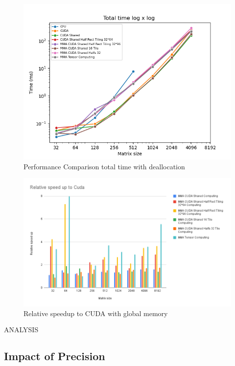 \documentclass[conference]{IEEEtran}
\begin{document}
  \begin{figure}[htbp]
    \centering
    \includegraphics[scale=0.5]{figures/Tot_time_deac.png}
    \caption{Performance Comparison total time with deallocation}
    \label{fig:time-comparison}
  \end{figure}



  \begin{figure}[htbp]
    \centering
    \includegraphics[scale=0.38]{figures/Relative speed up to Cuda.png}
    \caption{Relative speedup to CUDA with global memory}
    \label{fig:performance-comparison}
  \end{figure}
  
  ANALYSIS
  
  \subsection{Impact of Precision}\label{sec:impact-precision}
  
\end{document}
